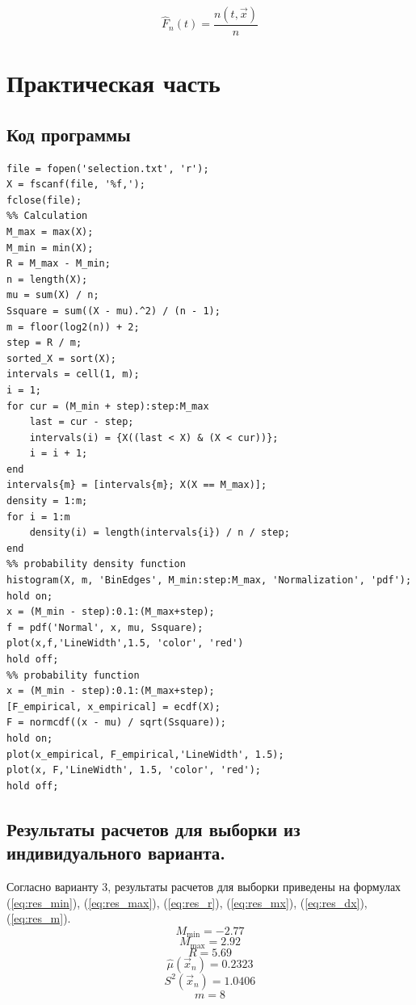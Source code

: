 \begin{equation}
	\hat F_n(t) = \frac{n(t, \vec x)}{n}
\end{equation}


\chapter{Практическая часть}
\section{Код программы}
\begin{lstlisting}[label=lst:code, caption=Программа для MatLAB, basicstyle=\footnotesize]
file = fopen('selection.txt', 'r');
X = fscanf(file, '%f,');
fclose(file);
%% Calculation
M_max = max(X);
M_min = min(X);
R = M_max - M_min;
n = length(X);
mu = sum(X) / n;
Ssquare = sum((X - mu).^2) / (n - 1);
m = floor(log2(n)) + 2;
step = R / m;
sorted_X = sort(X);
intervals = cell(1, m);
i = 1;
for cur = (M_min + step):step:M_max
    last = cur - step;
    intervals(i) = {X((last < X) & (X < cur))};
    i = i + 1;
end
intervals{m} = [intervals{m}; X(X == M_max)];
density = 1:m;
for i = 1:m
    density(i) = length(intervals{i}) / n / step;
end
%% probability density function
histogram(X, m, 'BinEdges', M_min:step:M_max, 'Normalization', 'pdf');
hold on;
x = (M_min - step):0.1:(M_max+step);
f = pdf('Normal', x, mu, Ssquare);
plot(x,f,'LineWidth',1.5, 'color', 'red')
hold off;
%% probability function
x = (M_min - step):0.1:(M_max+step);
[F_empirical, x_empirical] = ecdf(X);
F = normcdf((x - mu) / sqrt(Ssquare));
hold on;
plot(x_empirical, F_empirical,'LineWidth', 1.5);
plot(x, F,'LineWidth', 1.5, 'color', 'red');
hold off;
\end{lstlisting}

\newpage
\section{Результаты расчетов для выборки из индивидуального варианта.}
Согласно варианту 3, результаты расчетов для выборки приведены на формулах (\ref{eq:res_min}), (\ref{eq:res_max}), (\ref{eq:res_r}), (\ref{eq:res_mx}), (\ref{eq:res_dx}), (\ref{eq:res_m}).
\begin{equation}
	\label{eq:res_min}
	M_{\min} = -2.77
\end{equation}
\begin{equation}
	\label{eq:res_max}
	M_{\max} = 2.92
\end{equation}
\begin{equation}
	\label{eq:res_r}
	R = 5.69
\end{equation}
\begin{equation}
	\label{eq:res_mx}
	\hat\mu(\vec x_n) = 0.2323
\end{equation}
\begin{equation}
	\label{eq:res_dx}
	S^2(\vec x_n) = 1.0406
\end{equation}
\begin{equation}
	\label{eq:res_m}
	m = 8
\end{equation}

